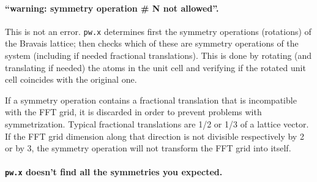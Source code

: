 \documentclass[12pt,a4paper]{article}
\begin{document}
\paragraph{``warning: symmetry operation \# N not allowed''.}

This is not an error.
\texttt{pw.x} determines first the symmetry operations (rotations)
of the Bravais lattice; then checks which of these are symmetry
operations of the system (including if needed fractional
translations).
This is done by rotating (and translating if needed) the atoms in
the unit cell and verifying if the rotated unit cell coincides
with the original one. 

If a symmetry operation contains a
fractional translation that is incompatible with the FFT grid,
it is discarded in order to prevent problems with symmetrization.
Typical fractional translations are 1/2 or 1/3 of a lattice
vector. If the FFT grid dimension along that direction is not 
divisible respectively by 2 or by 3, the symmetry operation will 
not transform the FFT grid into itself.

\paragraph{\texttt{pw.x} doesn't find all the symmetries you
           expected.}
\end{document}
